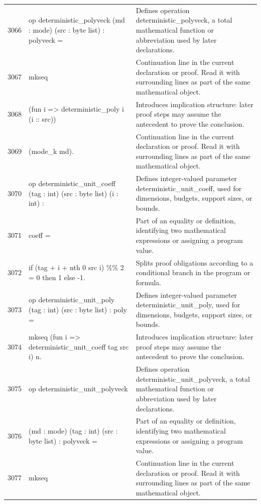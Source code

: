 \documentclass[10pt]{article}
\begin{document}
\begin{longtable}{r L{0.53\textwidth} L{0.37\textwidth}}
3066 & {\ttfamily\scriptsize op deterministic\_polyveck (md : mode) (src : byte list) : polyveck =} & Defines operation deterministic\_polyveck, a total mathematical function or abbreviation used by later declarations. \\
3067 & {\ttfamily\scriptsize   mkseq} & Continuation line in the current declaration or proof.  Read it with surrounding lines as part of the same mathematical object. \\
3068 & {\ttfamily\scriptsize     (fun i => deterministic\_poly i (i :: src))} & Introduces implication structure: later proof steps may assume the antecedent to prove the conclusion. \\
3069 & {\ttfamily\scriptsize     (mode\_k md).} & Continuation line in the current declaration or proof.  Read it with surrounding lines as part of the same mathematical object. \\
3070 & {\ttfamily\scriptsize op deterministic\_unit\_coeff (tag : int) (src : byte list) (i : int) :} & Defines integer-valued parameter deterministic\_unit\_coeff, used for dimensions, budgets, support sizes, or bounds. \\
3071 & {\ttfamily\scriptsize   coeff =} & Part of an equality or definition, identifying two mathematical expressions or assigning a program value. \\
3072 & {\ttfamily\scriptsize   if (tag + i + nth 0 src i) \%\% 2 = 0 then 1 else -1.} & Splits proof obligations according to a conditional branch in the program or formula. \\
3073 & {\ttfamily\scriptsize op deterministic\_unit\_poly (tag : int) (src : byte list) : poly =} & Defines integer-valued parameter deterministic\_unit\_poly, used for dimensions, budgets, support sizes, or bounds. \\
3074 & {\ttfamily\scriptsize   mkseq (fun i => deterministic\_unit\_coeff tag src i) n.} & Introduces implication structure: later proof steps may assume the antecedent to prove the conclusion. \\
3075 & {\ttfamily\scriptsize op deterministic\_unit\_polyveck} & Defines operation deterministic\_unit\_polyveck, a total mathematical function or abbreviation used by later declarations. \\
3076 & {\ttfamily\scriptsize    (md : mode) (tag : int) (src : byte list) : polyveck =} & Part of an equality or definition, identifying two mathematical expressions or assigning a program value. \\
3077 & {\ttfamily\scriptsize   mkseq} & Continuation line in the current declaration or proof.  Read it with surrounding lines as part of the same mathematical object. \\

\end{longtable}
\end{document}
